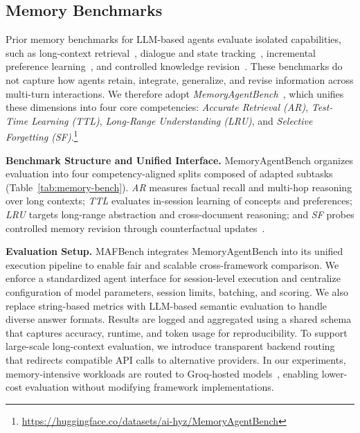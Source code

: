 \vspace{-1.5mm}
\subsection{Memory Benchmarks}
\label{subsec:bench_memory}

Prior memory benchmarks for LLM-based agents evaluate isolated capabilities, such as long-context retrieval~\cite{hsieh2024ruler,wu2024longmemeval,zhang2024bench}, dialogue and state tracking~\cite{li2018towards,liu2021benchmarking}, incremental preference learning~\cite{casanueva2020efficient,larson2019evaluation,he2023large}, and controlled knowledge revision~\cite{zhong2023mquake}. These benchmarks do not capture how agents retain, integrate, generalize, and revise information across multi-turn interactions. We therefore adopt \emph{MemoryAgentBench}~\cite{hu2025memoryagentbench}, which unifies these dimensions into four core competencies: \textit{Accurate Retrieval (AR)}, \textit{Test-Time Learning (TTL)}, \textit{Long-Range Understanding (LRU)}, and \textit{Selective Forgetting (SF)}.\footnote{\url{https://huggingface.co/datasets/ai-hyz/MemoryAgentBench}}


\noindent\textbf{Benchmark Structure and Unified Interface.}
MemoryAgentBench organizes evaluation into four competency-aligned splits composed of adapted subtasks (Table~\ref{tab:memory-bench}). \textit{AR} measures factual recall and multi-hop reasoning over long contexts; \textit{TTL} evaluates in-session learning of concepts and preferences; \textit{LRU} targets long-range abstraction and cross-document reasoning; and \textit{SF} probes controlled memory revision through counterfactual updates~\cite{hu2025memoryagentbench}.

\noindent\textbf{Evaluation Setup.}
MAFBench integrates MemoryAgentBench into its unified execution pipeline to enable fair and scalable cross-framework comparison. We enforce a standardized agent interface for session-level execution and centralize configuration of model parameters, session limits, batching, and scoring. We also replace string-based metrics with LLM-based semantic evaluation to handle diverse answer formats. Results are logged and aggregated using a shared schema that captures accuracy, runtime, and token usage for reproducibility. To support large-scale long-context evaluation, we introduce transparent backend routing that redirects compatible API calls to alternative providers. In our experiments, memory-intensive workloads are routed to Groq-hosted models~\cite{groq}, enabling lower-cost evaluation without modifying framework implementations.
